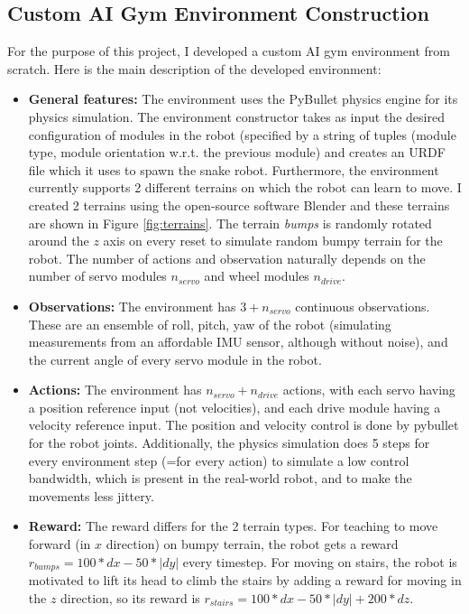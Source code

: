\documentclass{article}
\begin{document}
\subsection{Custom AI Gym Environment Construction}
For the purpose of this project, I developed a custom AI gym environment from scratch. Here is the main description of the developed environment:
\begin{itemize}
  \item \textbf{General features:} The environment uses the PyBullet physics engine for its physics simulation. 
The environment constructor takes as input the desired configuration of modules in the robot (specified by a string of tuples (module type, module orientation w.r.t. the previous module) and creates an URDF file which it uses to spawn the snake robot.
Furthermore, the environment currently supports 2 different terrains on which the robot can learn to move.
    I created 2 terrains using the open-source software Blender and these terrains are shown in Figure \ref{fig:terrains}. The terrain \textit{bumps} is randomly rotated around the $z$ axis on every reset to simulate random bumpy terrain for the robot.
    The number of actions and observation naturally depends on the number of servo modules $n_{servo}$ and wheel modules $n_{drive}$.
  \item \textbf{Observations:} The environment has $3+ n_{servo}$ continuous observations. These are an ensemble of roll, pitch, yaw of the robot (simulating measurements from an affordable IMU sensor, although without noise), and the current angle of every servo module in the robot.
  \item \textbf{Actions:}  The environment has $n_{servo} + n_{drive}$ actions, with each servo having a position reference input (not velocities), and each drive module having a velocity reference input. The position and velocity control is done by pybullet for the robot joints.
    Additionally, the physics simulation does 5 steps for every environment step (=for every action) to simulate a low control bandwidth, which is present in the real-world robot, and to make the movements less jittery.
  \item \textbf{Reward:} The reward differs for the 2 terrain types. For teaching to move forward (in $x$ direction) on bumpy terrain, the robot gets a reward $r_{bumps} = 100*dx - 50*|dy|$ every timestep. For moving on stairs, the robot is motivated to lift its head to climb the stairs by adding a reward for moving in the $z$ direction, so its reward is $r_{stairs} = 100*dx - 50*|dy| + 200*dz$.

\end{itemize}
\end{document}
